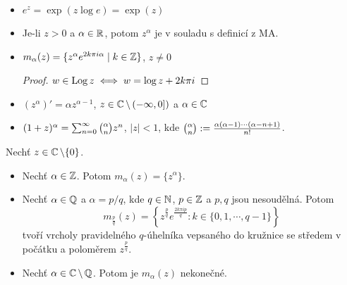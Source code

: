 \begin{properties}
\mbox{}
\vspace{-2em}
\begin{itemize}
    \item $e^z=\exp(z \log e)=\exp(z)$ 
    \item Je-li $z>0$ a $\alpha\in\operatorname{\mathbb{R}} $, potom $z^{\alpha}$ je v souladu s definicí z MA.
    \item $m_{\alpha}(z)=\{z^{\alpha}e^{2k\pi i \alpha}\mid k\in\operatorname{\mathbb{Z}} \}$, $z\neq 0$
    \begin{proof}$w\in \operatorname*{Log} z\iff w=\log z +2k\pi i$\end{proof}
    \item $(z^{\alpha})'=\alpha z^{\alpha-1}$, $z\in\operatorname{\mathbb{C}}  \setminus\left (-\infty,0\right ])$ a $\alpha\in\operatorname{\mathbb{C}}  $
    \item $(1+z)^{\alpha}=\sum_{n=0}^{\infty}\tbinom{\alpha}{n}z^{n} $, $\lvert z \rvert<1$, kde $\tbinom{\alpha}{n}:=\frac{\alpha(\alpha-1)\cdots(\alpha-n+1)}{n!}$.%
\end{itemize}
\end{properties}

\begin{observation}
Nechť $z \in\operatorname{\mathbb{C}}  \setminus\{0\}$.
\begin{itemize}
    \item Nechť $\alpha\in\operatorname{\mathbb{Z}} $. Potom $m_{\alpha}(z)=\{z^{\alpha}\}$.%
    \item Nechť $\alpha\in\operatorname{\mathbb{Q}}$ a $\alpha=p/q$, kde $q\in\operatorname{\mathbb{N}}$, $p\in\operatorname{\mathbb{Z}} $ a $p,q$ jsou nesoudělná. Potom $$m_{\frac{p}{q}}(z)= \left\{ z^{\frac{p}{q}}e^{\frac{2k\pi i p}{q}}: k\in\{0,1,\cdots,q-1\} \right\}$$
    tvoří vrcholy pravidelného $q$-úhelníka vepsaného do kružnice se středem v počátku a poloměrem $z^{\frac{p}{q}}$. %
    \item Nechť $\alpha\in\operatorname{\mathbb{C}}  \setminus\operatorname{\mathbb{Q}}$. Potom je $m_{\alpha}(z)$ nekonečné.%
\end{itemize}
\end{observation}

